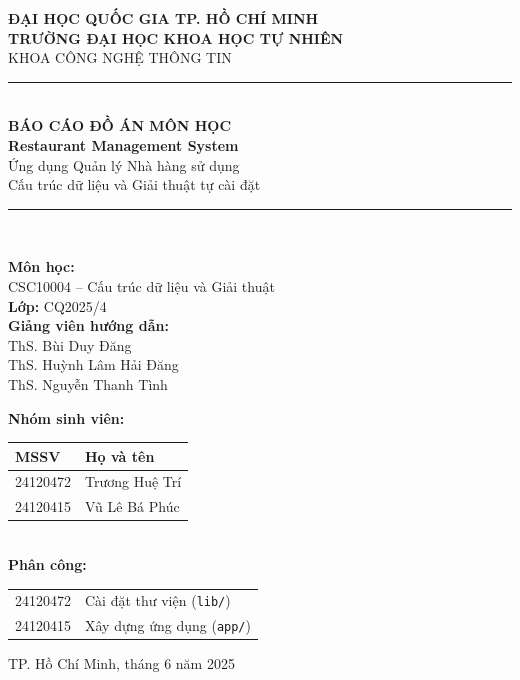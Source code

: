 \documentclass[12pt, a4paper]{article}
\begin{document}
\begin{titlepage}
  \centering
  \vspace*{0.5cm}
  {\large\bfseries ĐẠI HỌC QUỐC GIA TP. HỒ CHÍ MINH}\\[0.2cm]
  {\large\bfseries TRƯỜNG ĐẠI HỌC KHOA HỌC TỰ NHIÊN}\\[0.1cm]
  {\large KHOA CÔNG NGHỆ THÔNG TIN}\\[1.5cm]

  \rule{\textwidth}{1.5pt}\\[0.4cm]
  {\LARGE\bfseries BÁO CÁO ĐỒ ÁN MÔN HỌC}\\[0.3cm]
  {\Large\bfseries\color{primary} Restaurant Management System}\\[0.2cm]
  {\normalsize Ứng dụng Quản lý Nhà hàng sử dụng\\
  Cấu trúc dữ liệu và Giải thuật tự cài đặt}\\[0.3cm]
  \rule{\textwidth}{1.5pt}\\[1.5cm]

  \begin{minipage}[t]{0.48\textwidth}
    \raggedright
    \textbf{Môn học:}\\
    CSC10004 -- Cấu trúc dữ liệu và Giải thuật\\[0.5cm]
    \textbf{Lớp:} CQ2025/4\\[0.5cm]
    \textbf{Giảng viên hướng dẫn:}\\
    ThS. Bùi Duy Đăng\\
    ThS. Huỳnh Lâm Hải Đăng\\
    ThS. Nguyễn Thanh Tình
  \end{minipage}
  \hfill
  \begin{minipage}[t]{0.48\textwidth}
    \raggedright
    \textbf{Nhóm sinh viên:}\\[0.3cm]
    \begin{tabular}{@{}ll@{}}
      \toprule
      \textbf{MSSV} & \textbf{Họ và tên} \\
      \midrule
      24120472 & Trương Huệ Trí \\
      24120415 & Vũ Lê Bá Phúc \\
      \bottomrule
    \end{tabular}\\[0.5cm]
    \textbf{Phân công:}\\[0.2cm]
    \begin{tabular}{@{}ll@{}}
      24120472 & Cài đặt thư viện (\texttt{lib/}) \\
      24120415 & Xây dựng ứng dụng (\texttt{app/}) \\
    \end{tabular}
  \end{minipage}

  \vfill
  {\large TP. Hồ Chí Minh, tháng 6 năm 2025}
\end{titlepage}
\end{document}
